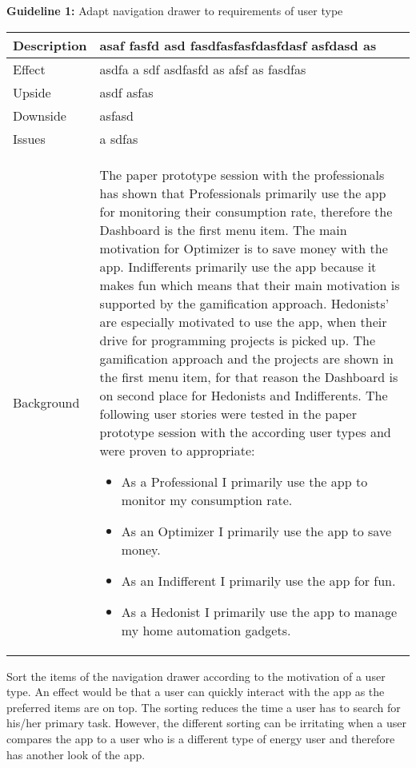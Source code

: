 \begin{table}
	\renewcommand{\arraystretch}{2}
	\textbf{Guideline 1:} Adapt navigation drawer to requirements of user type
	\newline

	\begin{tabular}{|p{2cm}p{10cm}|}
	
		\hline 
		Description & asaf fasfd asd fasdfasfasfdasfdasf asfdasd as \\ 
		\hline 
		Effect &  asdfa a sdf asdfasfd as afsf as fasdfas\\ 
		\hline 
		Upside &   asdf asfas\\ 
		\hline 
		Downside &  asfasd  \\ 
		\hline 
		Issues &  a sdfas \\ 
		\hline 
		Background & The paper prototype session with the professionals has shown that Professionals primarily use the app for monitoring their consumption rate, therefore the Dashboard is the first menu item. The main motivation for Optimizer is to save money with the app. Indifferents primarily use the app because it makes fun which means that their main motivation is supported by the gamification approach. Hedonists' are especially motivated to use the app, when their drive for programming projects is picked up. The gamification approach and the projects are shown in the first menu item, for that reason the Dashboard is on second place for Hedonists and Indifferents. The following user stories were tested in the paper prototype session with the according user types and were proven to appropriate:
		\begin{itemize}
			\item As a Professional I primarily use the app to monitor my consumption rate.
			\item As an Optimizer I primarily use the app to save money.
			\item As an Indifferent I primarily use the app for fun.
			\item As a Hedonist I primarily use the app to manage my home automation gadgets.
		\end{itemize}
		\\ 
		\hline
		
	\end{tabular}
	\renewcommand{\arraystretch}{1}
\end{table}




Sort the items of the navigation drawer according to the motivation of a user type. An effect would be that a user can quickly interact with the app as the preferred items are on top. The sorting reduces the time a user has to search for his/her primary task. However, the different sorting can be irritating when a user compares the app to a user who is a different type of energy user and therefore has another look of the app.

